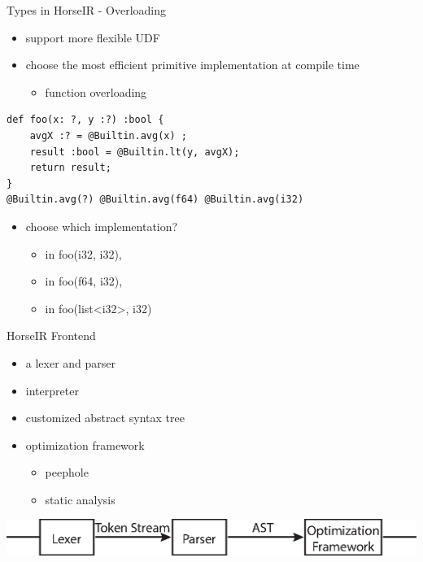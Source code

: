 \documentclass{beamer}
\begin{document}
\begin{frame}[fragile]{Types in HorseIR - Overloading}
\begin{itemize}
    \item support more flexible UDF
    \item choose the most efficient primitive implementation at compile time
          \begin{itemize}
          \item function overloading
          \end{itemize}
\end{itemize}

\begin{lstlisting}
def foo(x: ?, y :?) :bool {
    avgX :? = @Builtin.avg(x) ; 
    result :bool = @Builtin.lt(y, avgX);
    return result;
}
@Builtin.avg(?) @Builtin.avg(f64) @Builtin.avg(i32) 
\end{lstlisting}
\begin{itemize}
    \item choose which implementation?
          \begin{itemize}
               \item in foo(i32, i32),
               \item in foo(f64, i32),
               \item in foo(list<i32>, i32)
          \end{itemize}
\end{itemize}
\end{frame}

\begin{frame}{HorseIR Frontend}
\begin{itemize}
    \item a lexer and parser
    \item interpreter
    \item customized abstract syntax tree
    \item optimization framework
          \begin{itemize}
          \item peephole
          \item static analysis
          \end{itemize}
\end{itemize}
\includegraphics[width=\textwidth]{horse-frontend}
\end{frame}
\end{document}

